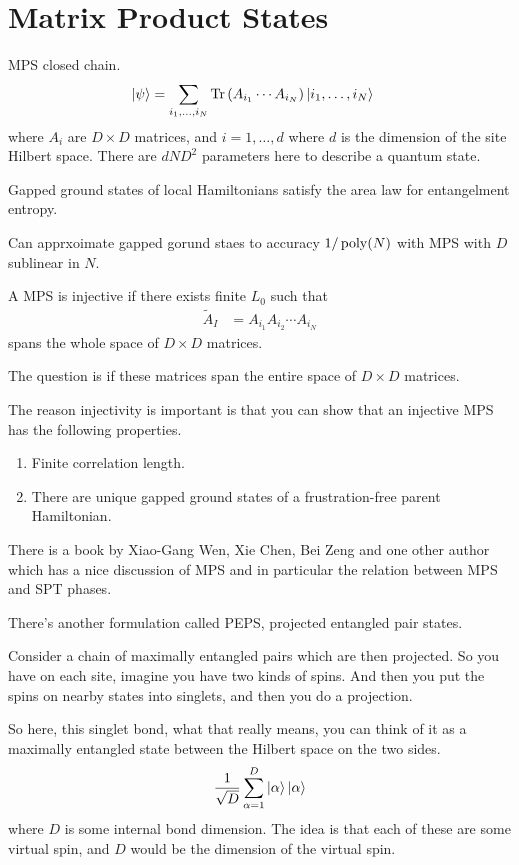 \section{Matrix Product States}
MPS closed chain.
\begin{align}
    \ket{\psi} &=
    \sum_{i_1,\ldots,i_N} \Tr\left( 
    A_{i_1}\cdots A_{i_N}
    \right)
    \ket{i_1,\ldots,i_N}
\end{align}
where $A_i$ are $D\times D$ matrices, and $i=1,\ldots, d$ where
$d$ is the dimension of the site Hilbert space.
There are $dND^2$ parameters here to describe a quantum state.

Gapped ground states of local Hamiltonians satisfy the area law for entangelment
entropy.

Can apprxoimate gapped gorund staes to accuracy $1/\operatorname{poly}(N)$
with MPS with $D$ sublinear in $N$.

A MPS is injective if there exists finite $L_0$ such that
\begin{align}
    \tilde{A}_I &=
    A_{i_1} A_{i_2} \cdots A_{i_N}
\end{align}
spans the whole space of $D\times D$ matrices.

The question is if these matrices span the entire space of $D\times D$
matrices.

The reason injectivity is important is that you can show that an injective MPS
has the following properties.
\begin{enumerate}
    \item Finite correlation length.
    \item There are unique gapped ground states of a frustration-free parent
        Hamiltonian.
\end{enumerate}

There is a book by Xiao-Gang Wen, Xie Chen, Bei Zeng and one other author which
has a nice discussion of MPS and in particular the relation between MPS and SPT
phases.

There's another formulation called PEPS,
projected entangled pair states.

Consider a chain of maximally entangled pairs which are then projected.
So you have on each site,
imagine you have two kinds of spins.
And then you put the spins on nearby states into singlets,
and then you do a projection.

So here, 
this singlet bond,
what that really means,
you can think of it as a maximally entangled state between the Hilbert space on
the two sides.
\begin{align}
    \frac{1}{\sqrt{D}} \sum_{\alpha=1}^{D} \ket{\alpha}\ket{\alpha}
\end{align}
where $D$ is some internal bond dimension.
The idea is that each of these are some virtual spin,
and $D$ would be the dimension of the virtual spin.

